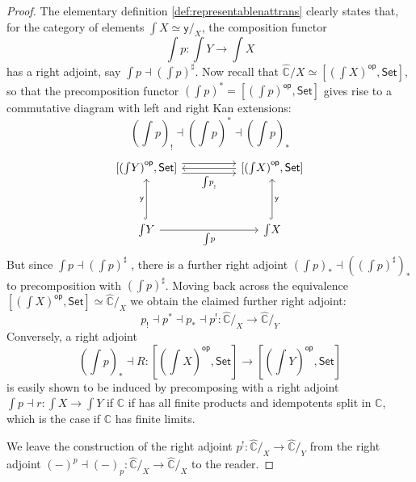 \documentclass[12pt,reqno]{amsart}
\newcommand{\C}{\ensuremath{\mathbb{C}}}
\newcommand{\op}[1]{\ensuremath{{#1}^{\mathsf{op}}}}
\newcommand{\psh}[1]{\ensuremath{[\op{#1},\mathsf{Set}]}}
\newcommand{\y}{\ensuremath{\mathsf{y}}} %
\renewcommand{\to}{\ensuremath{\rightarrow}}
\newcommand{\too}{\ensuremath{\longrightarrow}}
\theoremstyle{remark}
\theoremstyle{definition}
\begin{document}
\begin{proof}
The elementary definition \ref{def:representablenattrans} clearly states that, for the category of elements ${\int\!X} \simeq {\y{}/_X}$, the composition functor 
\[\textstyle
{\int\!p} : {\int\!Y} \to {\int\!X}
\]  
has a right adjoint, say ${\int\!p} \dashv ({\int\!p})^\sharp$. Now recall that $\widehat{\C}/{X} \simeq \psh{(\int\!X)}$, so that the precomposition functor $({\int\!p})^* = \psh{({\int\!p})}$ gives rise to a commutative diagram with left and right Kan extensions:
\[\textstyle
({\int\!p})_!\dashv ({\int\!p})^* \dashv ({\int\!p})_*
\]
%
\begin{equation}\begin{tikzcd}
\psh{(\int{\!Y})} \ar[rr,shift right = 1ex,swap, "{\int\!p}_!"]  \ar[rr,shift left = 1ex] &&   \psh{(\int{\!X})} \ar[ll] \\
&& \\
\int{\!Y} \ar[uu, hook, "{\y{}}"]  \ar[rr, swap, "{\int\!p}"]  &&  \int{\!X} \ar[uu, swap,hook, "{\y{}}"]
\end{tikzcd}\end{equation}
%
But since ${\int\!p} \dashv ({\int\!p})^\sharp$ , there is a further right adjoint $({\int\!p})_* \dashv (({\int\!p})^\sharp)_*$ to precomposition with $({\int\!p})^\sharp$.  Moving back across the equivalence $\psh{(\int\!X)} \simeq \widehat{\C}/_{X}$ we obtain the claimed further right adjoint: 
\[
p_! \dashv p^* \dashv p_*\dashv p^! :  \widehat{\C}/_{X} \too \widehat{\C}/_{Y}
\]
%
Conversely, a right adjoint $$\textstyle ({\int\!p})_* \dashv R : \psh{(\int{\!X})} \to \psh{(\int{\!Y})}$$ is easily shown to be induced by precomposing with a right adjoint ${\int\!p} \dashv r : {\int\!X} \to {\int\!Y}$ if $\C$ if has all finite products and idempotents split in $\C$, which is the case if $\C$ has finite limits.

We leave the construction of the right adjoint $p^!:  \widehat{\C}/_{X} \too \widehat{\C}/_{Y}$ from the  right adjoint $(-)^p \dashv (-)_p : \widehat{\C}/_{X} \to \widehat{\C}/_{X}$ to the reader.
\end{proof}
\end{document}
